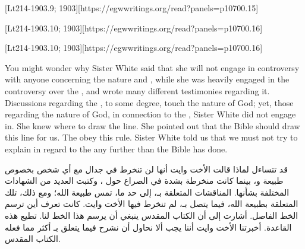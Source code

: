 [Lt214-1903.9; 1903][https://egwwritings.org/read?panels=p10700.15]


[Lt214-1903.10; 1903][https://egwwritings.org/read?panels=p10700.16]


[Lt214-1903.10; 1903][https://egwwritings.org/read?panels=p10700.16]


You might wonder why Sister White said that she will not engage in controversy with anyone concerning the nature and , while she was heavily engaged in the controversy over the , and wrote many different testimonies regarding it. Discussions regarding the , to some degree, touch the nature of God; yet, those regarding the nature of God, in connection to the , Sister White did not engage in. She knew where to draw the line. She pointed out that the Bible should draw this line for us.  The  obey this rule. Sister White told us that we must not try to explain in regard to the  any further than the Bible has done.


قد تتساءل لماذا قالت الأخت وايت أنها لن تنخرط في جدال مع أي شخص بخصوص طبيعة و، بينما كانت منخرطة بشدة في الصراع حول ، وكتبت العديد من الشهادات المختلفة بشأنها. المناقشات المتعلقة بـ، إلى حد ما، تمس طبيعة الله؛ ومع ذلك، تلك المتعلقة بطبيعة الله، فيما يتصل بـ، لم تنخرط فيها الأخت وايت. كانت تعرف أين ترسم الخط الفاصل. أشارت إلى أن الكتاب المقدس ينبغي أن يرسم هذا الخط لنا.  تطيع  هذه القاعدة. أخبرتنا الأخت وايت أننا يجب ألا نحاول أن نشرح فيما يتعلق بـ أكثر مما فعله الكتاب المقدس.


